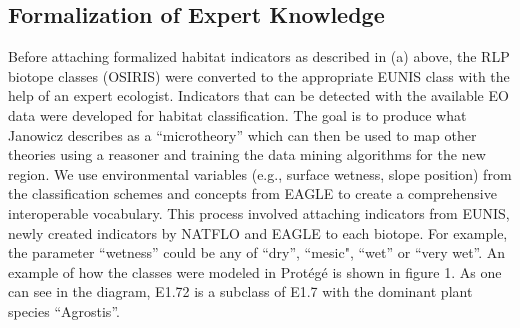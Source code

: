 \documentclass[authoryear, review,12pt,number]{elsarticle}
\begin{document}
\subsection{Formalization of Expert Knowledge}
Before attaching formalized habitat indicators as described in (a) above, the
RLP biotope classes (OSIRIS) were converted to the appropriate EUNIS class
with the help of an expert ecologist.  Indicators that can be detected with
the available EO data were developed for habitat classification. The goal is to
produce what Janowicz describes as a ``microtheory'' \citep{Janowicz2012} which
can then be used to map other theories using a reasoner and training the data mining algorithms for
the new region. We use environmental variables (e.g.,
surface wetness, slope position) from the classification schemes and concepts
from EAGLE to create a comprehensive interoperable vocabulary. This process
involved attaching indicators from EUNIS, newly created indicators by NATFLO
and EAGLE to each biotope. For example, the parameter ``wetness'' could be any
of ``dry'', ``mesic", ``wet'' or ``very wet''. 
An example of how the classes were  modeled in Prot\'eg\'e is shown in figure 1.
As one can see in the diagram, E1.72 is a subclass of E1.7 with the dominant plant species 
``Agrostis''.
\end{document}

